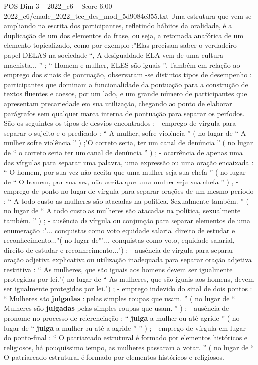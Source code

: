 \begin{textsample}{POS Dim 3 – 2022\_c6 – Score 6.00 – 2022\_c6/enade\_2022\_tec\_des\_mod\_5d9084e355.txt}
Uma estrutura que vem se ampliando na escrita dos participantes, refletindo hábitos da oralidade, é a duplicação de um dos elementos da frase, ou seja, a retomada anafórica de um elemento topicalizado, como por exemplo :"Elas precisam saber o verdadeiro papel DELAS na sociedade “, A desigualdade ELA vem de uma cultura machista... ” ; “ Homem e mulher, ELES são iguais ”.
Também em relação ao emprego dos sinais de pontuação, observaram -se distintos tipos de desempenho : participantes que dominam a funcionalidade da pontuação para a construção de textos fluentes e coesos, por um lado, e um grande número de participantes que apresentam precariedade em sua utilização, chegando ao ponto de elaborar parágrafos sem qualquer marca interna de pontuação para separar os períodos.
São os seguintes os tipos de desvios encontrados : - emprego de vírgula para separar o sujeito e o predicado : “ A mulher, sofre violência ” ( no lugar de “ A mulher sofre violência ” ) ;"O correto seria, ter um canal de denúncia ” ( no lugar de “ o correto seria ter um canal de denúncia ” ) ; - ocorrência de apenas uma das vírgulas para separar uma palavra, uma expressão ou uma oração encaixada : “ O homem, por sua vez não aceita que uma mulher seja sua chefa ” ( no lugar de “ O homem, por sua vez, não aceita que uma mulher seja sua chefa ” ) ; - emprego de ponto no lugar de vírgula para separar orações de um mesmo período : “ A todo custo as mulheres são atacadas na política.
Sexualmente também. ” ( no lugar de “ A todo custo as mulheres são atacadas na política, sexualmente também. ” ) ; - ausência de vírgula ou conjunção para separar elementos de uma enumeração :"... conquistas como voto equidade salarial direito de estudar e reconhecimento..."( no lugar de""... conquistas como voto, equidade salarial, direito de estudar e reconhecimento...") ; - ausência de vírgula para separar oração adjetiva explicativa ou utilização inadequada para separar oração adjetiva restritiva : “ As mulheres, que são iguais aos homens devem ser igualmente protegidas por lei."( no lugar de “ As mulheres, que são iguais aos homens, devem ser igualmente protegidas por lei.") ; - emprego indevido do sinal de dois pontos : “ Mulheres são \textbf{julgadas} : pelas simples roupas que usam. ” ( no lugar de “ Mulheres são \textbf{julgadas} pelas simples roupas que usam. ” ) ; - ausência de pronome no processo de referenciação : “ \textbf{julga} a mulher ou até agride ” ( no lugar de “ \textbf{julga} a mulher ou até a agride ” ” ) ; - emprego de vírgula em lugar do ponto-final : “ O patriarcado estrutural é formado por elementos históricos e religiosos, há pouquíssimo tempo, as mulheres passaram a votar. ” ( no lugar de “ O patriarcado estrutural é formado por elementos históricos e religiosos.

\end{textsample}
